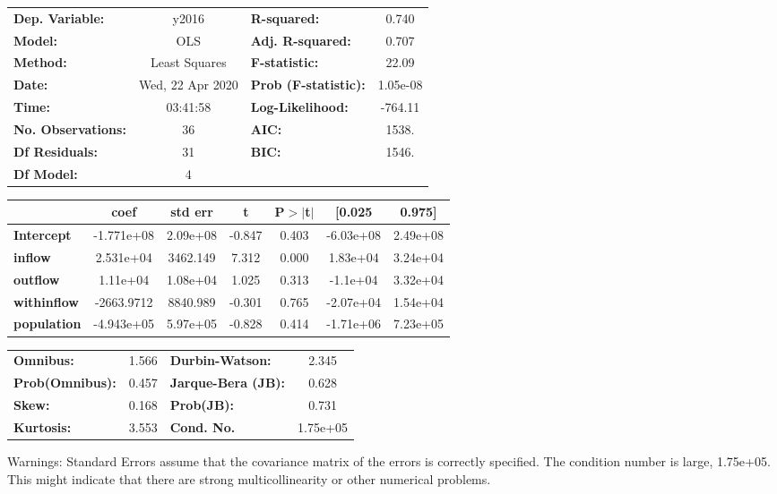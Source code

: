 \begin{center}
\begin{tabular}{lclc}
\toprule
\textbf{Dep. Variable:}    &      y2016       & \textbf{  R-squared:         } &     0.740   \\
\textbf{Model:}            &       OLS        & \textbf{  Adj. R-squared:    } &     0.707   \\
\textbf{Method:}           &  Least Squares   & \textbf{  F-statistic:       } &     22.09   \\
\textbf{Date:}             & Wed, 22 Apr 2020 & \textbf{  Prob (F-statistic):} &  1.05e-08   \\
\textbf{Time:}             &     03:41:58     & \textbf{  Log-Likelihood:    } &   -764.11   \\
\textbf{No. Observations:} &          36      & \textbf{  AIC:               } &     1538.   \\
\textbf{Df Residuals:}     &          31      & \textbf{  BIC:               } &     1546.   \\
\textbf{Df Model:}         &           4      & \textbf{                     } &             \\
\bottomrule
\end{tabular}
\begin{tabular}{lcccccc}
                    & \textbf{coef} & \textbf{std err} & \textbf{t} & \textbf{P$> |$t$|$} & \textbf{[0.025} & \textbf{0.975]}  \\
\midrule
\textbf{Intercept}  &   -1.771e+08  &     2.09e+08     &    -0.847  &         0.403        &    -6.03e+08    &     2.49e+08     \\
\textbf{inflow}     &    2.531e+04  &     3462.149     &     7.312  &         0.000        &     1.83e+04    &     3.24e+04     \\
\textbf{outflow}    &     1.11e+04  &     1.08e+04     &     1.025  &         0.313        &     -1.1e+04    &     3.32e+04     \\
\textbf{withinflow} &   -2663.9712  &     8840.989     &    -0.301  &         0.765        &    -2.07e+04    &     1.54e+04     \\
\textbf{population} &   -4.943e+05  &     5.97e+05     &    -0.828  &         0.414        &    -1.71e+06    &     7.23e+05     \\
\bottomrule
\end{tabular}
\begin{tabular}{lclc}
\textbf{Omnibus:}       &  1.566 & \textbf{  Durbin-Watson:     } &    2.345  \\
\textbf{Prob(Omnibus):} &  0.457 & \textbf{  Jarque-Bera (JB):  } &    0.628  \\
\textbf{Skew:}          &  0.168 & \textbf{  Prob(JB):          } &    0.731  \\
\textbf{Kurtosis:}      &  3.553 & \textbf{  Cond. No.          } & 1.75e+05  \\
\bottomrule
\end{tabular}
\end{center}

Warnings: \newline
 [1] Standard Errors assume that the covariance matrix of the errors is correctly specified. \newline
 [2] The condition number is large, 1.75e+05. This might indicate that there are \newline
 strong multicollinearity or other numerical problems.